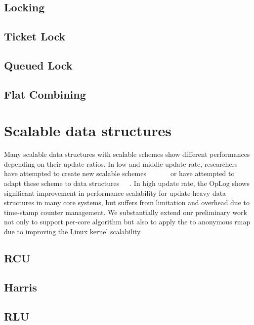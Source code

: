 \subsection{Locking}

\subsection{Ticket Lock}

\subsection{Queued Lock}

\subsection{Flat Combining}

\section{Scalable data structures}
\label{sec:datarelated}
Many scalable data structures with scalable schemes show
different performances depending on their update ratios.
In low and middle update rate, researchers have attempted to create new scalable
schemes~\cite{McKenney98}~\cite{Matveev2015RLU}~\cite{Harris2001Lockfree}
~\cite{Fomitchev2004Lockfree}
~\cite{Timnat2012}
or have attempted to adapt these scheme to data structures~\cite{Arbel2014ConcurrentRCU}~\cite{Dodds2015SCT}~\cite{AustinTClements2012RCUBalancedTrees}.
In high update rate, the OpLog shows significant improvement in
performance scalability for update-heavy data structures in
many core systems, but suffers from limitation and overhead due
to time-stamp counter management.
We substantially extend our preliminary work~\cite{Kyong2016LDU} not only to support 
per-core algorithm but also to apply the \LDU to anonymous rmap due to improving the
Linux kernel scalability.

\subsection{RCU}

\subsection{Harris}


\subsection{RLU}



